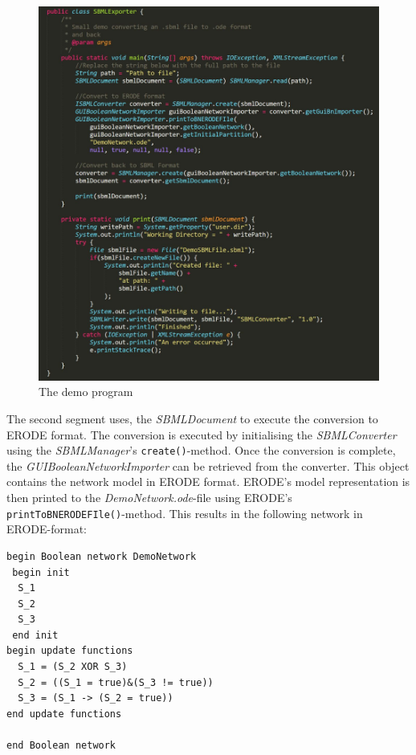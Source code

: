 \begin{figure}[H]
    \centering
    \includegraphics[scale=0.47]{Sections/Images/SBMLExporter.JPG}
    \caption{The demo program}
    \label{fig:demo}
\end{figure}

The second segment uses, the \emph{SBMLDocument} to execute the conversion to ERODE format. The conversion is executed by initialising the \emph{SBMLConverter} using the \emph{SBMLManager}'s \texttt{create()}-method. Once the conversion is complete, the \emph{GUIBooleanNetworkImporter} can be retrieved from the converter. This object contains the network model in ERODE format. ERODE's model representation is then printed to the \emph{DemoNetwork.ode}-file using ERODE's \texttt{printToBNERODEFIle()}-method. This results in the following network in \\
ERODE-format:
\pagebreak
\begin{lstlisting}[language=ERODE, caption=The ERODE formatted network]
begin Boolean network DemoNetwork
 begin init
  S_1
  S_2
  S_3
 end init
begin update functions
  S_1 = (S_2 XOR S_3)
  S_2 = ((S_1 = true)&(S_3 != true))
  S_3 = (S_1 -> (S_2 = true))
end update functions

end Boolean network
\end{lstlisting}

